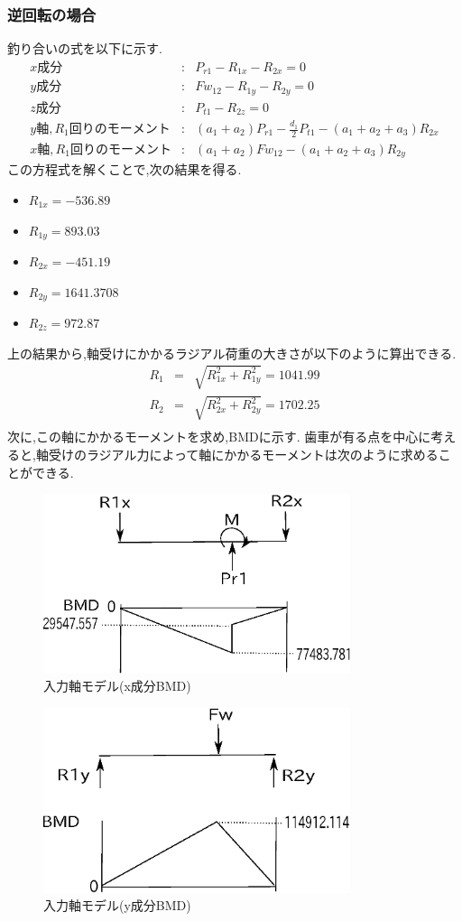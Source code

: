 \subsubsection{逆回転の場合}
釣り合いの式を以下に示す.
\begin{eqnarray}
x成分&:&P_{r1}-R_{1x}-R_{2x}=0\\
y成分&:&Fw_{12}-R_{1y}-R_{2y}=0\\
z成分&:&P_{t1}-R_{2z}=0\\
y軸,R_1回りのモーメント&:&(a_1+a_2)P_{r1}-\frac{d_1}{2}P_{t1}-(a_1+a_2+a_3)R_{2x}\\
x軸,R_1回りのモーメント&:&(a_1+a_2)Fw_{12}-(a_1+a_2+a_3)R_{2y}
\end{eqnarray}
この方程式を解くことで,次の結果を得る.
\begin{itemize}
\item $R_{1x}=-536.89$
\item $R_{1y}=893.03$
\item $R_{2x}=-451.19$
\item $R_{2y}=1641.3708$
\item $R_{2z}=972.87$
\end{itemize}
上の結果から,軸受けにかかるラジアル荷重の大きさが以下のように算出できる.
\begin{eqnarray}
R_1 &=& \sqrt {R_{1x}^2+R_{1y}^2}=1041.99\\
R_2 &=& \sqrt {R_{2x}^2+R_{2y}^2}=1702.25\\
\end{eqnarray}
次に,この軸にかかるモーメントを求め,BMDに示す.
歯車が有る点を中心に考えると,軸受けのラジアル力によって軸にかかるモーメントは次のように求めることができる.
\begin{figure}[htbp]
\begin{center}
\includegraphics[width=9cm]{../picture/jiku142.eps}
\end{center}
\caption{入力軸モデル(x成分BMD)}
\end{figure}
\begin{figure}[htbp]
\begin{center}
\includegraphics[width=9cm]{../picture/jiku132.eps}
\end{center}
\caption{入力軸モデル(y成分BMD)}
\end{figure}
